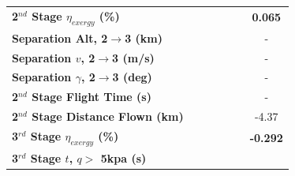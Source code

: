\begin{table}[ht]
\begin{tabular}{l c c c c c c}
		\hline 
		\textbf{2$^{nd}$ Stage $\eta_{exergy}$ (\%)}
		& \textbf{\secondExergyEffmThreeNinetyNoReturn}
		& \textbf{\secondExergyEffmThreeNinetyFiveNoReturn}
		& \textbf{\secondExergyEffmThreeStandardNoReturn}
		& \textbf{\secondExergyEffmThreeOneHundredFiveNoReturn}
		& \textbf{\secondExergyEffmThreeOneHundredTenNoReturn}
		& \textbf{0.065}
		\\
		\textbf{Separation Alt, 2$\rightarrow$3 (km)}
		& \secondthirdSeparationAltmThreeNinetyNoReturn
		& \secondthirdSeparationAltmThreeNinetyFiveNoReturn
		& \secondthirdSeparationAltmThreeStandardNoReturn
		& \secondthirdSeparationAltmThreeOneHundredFiveNoReturn
		& \secondthirdSeparationAltmThreeOneHundredTenNoReturn
		& -
		\\
		\textbf{Separation $v$, 2$\rightarrow$3 (m/s)}
		& \secondthirdSeparationvmThreeNinetyNoReturn
		& \secondthirdSeparationvmThreeNinetyFiveNoReturn
		& \secondthirdSeparationvmThreeStandardNoReturn
		& \secondthirdSeparationvmThreeOneHundredFiveNoReturn
		& \secondthirdSeparationvmThreeOneHundredTenNoReturn
		& -
		\\
		\textbf{Separation $\gamma$, 2$\rightarrow$3 (deg)}
		& \secondthirdSeparationgammamThreeNinetyNoReturn
		& \secondthirdSeparationgammamThreeNinetyFiveNoReturn
		& \secondthirdSeparationgammamThreeStandardNoReturn
		& \secondthirdSeparationgammamThreeOneHundredFiveNoReturn
		& \secondthirdSeparationgammamThreeOneHundredTenNoReturn
		& -
		\\
		\textbf{2$^{nd}$ Stage Flight Time (s)}
		& \secondFlightTimemThreeNinetyNoReturn
		& \secondFlightTimemThreeNinetyFiveNoReturn
		& \secondFlightTimemThreeStandardNoReturn
		& \secondFlightTimemThreeOneHundredFiveNoReturn
		& \secondFlightTimemThreeOneHundredTenNoReturn
		& -
		\\
		\textbf{2$^{nd}$ Stage Distance Flown (km)}
		& \SecondDistmThreeNinetyNoReturn
		& \SecondDistmThreeNinetyFiveNoReturn
		& \SecondDistmThreeStandardNoReturn
		& \SecondDistmThreeOneHundredFiveNoReturn
		& \SecondDistmThreeOneHundredTenNoReturn
		&-4.37
		\\
		\hline 
		\textbf{3$^{rd}$ Stage $\eta_{exergy}$ (\%)}
		& \textbf{\thirddExergyEffmThreeNinetyNoReturn}
		& \textbf{\thirddExergyEffmThreeNinetyFiveNoReturn}
		& \textbf{\thirddExergyEffmThreeStandardNoReturn}
		& \textbf{\thirddExergyEffmThreeOneHundredFiveNoReturn}
		& \textbf{\thirddExergyEffmThreeOneHundredTenNoReturn}
		& \textbf{-0.292}
		\\
		\textbf{3$^{rd}$ Stage $t$, $q >$ 5kpa (s)}
		& \thirdqOverFivemThreeNinetyNoReturn

\end{tabular}
\end{table}
